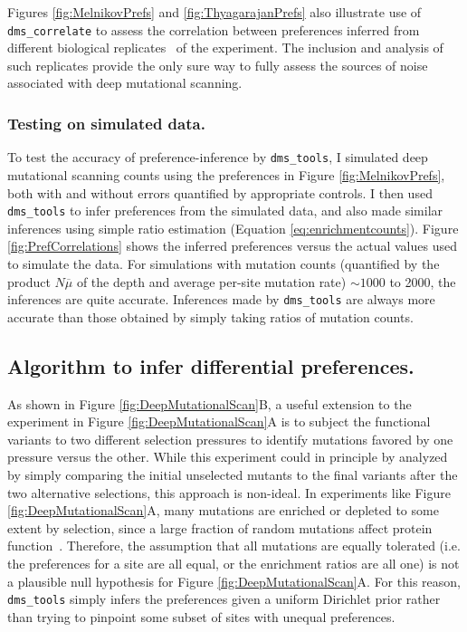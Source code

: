 \documentclass[twocolumn]{bmcart}%
\begin{document}
Figures \ref{fig:MelnikovPrefs} and \ref{fig:ThyagarajanPrefs} also illustrate use of \texttt{dms\_correlate} to assess the correlation between preferences inferred from different biological replicates~\cite{blainey2014points} of the experiment. The inclusion and analysis of such replicates provide the only sure way to fully assess the sources of noise associated with deep mutational scanning.

\subsubsection*{Testing on simulated data.}
To test the accuracy of preference-inference by \texttt{dms\_tools}, I simulated deep mutational scanning counts using the preferences in Figure \ref{fig:MelnikovPrefs}, both with and without errors quantified by appropriate controls. I then used \texttt{dms\_tools} to infer preferences from the simulated data, and also made similar inferences using simple ratio estimation (Equation \ref{eq:enrichmentcounts}). Figure \ref{fig:PrefCorrelations} shows the inferred preferences versus the actual values used to simulate the data. For simulations with mutation counts (quantified by the product $N\overline{\mu}$ of the depth and average per-site mutation rate) $\sim 1000$ to 2000, the inferences are quite accurate. Inferences made by \texttt{dms\_tools} are always more accurate than those obtained by simply taking ratios of mutation counts.

\subsection*{Algorithm to infer differential preferences.}
As shown in Figure \ref{fig:DeepMutationalScan}B, a useful extension to the experiment in Figure \ref{fig:DeepMutationalScan}A is to subject the functional variants to two different selection pressures to identify mutations favored by one pressure versus the other. While this experiment could in principle by analyzed by simply comparing the initial unselected mutants to the final variants after the two alternative selections, this approach is non-ideal. In experiments like Figure \ref{fig:DeepMutationalScan}A, many mutations are enriched or depleted to some extent by selection, since a large fraction of random mutations affect protein function~\cite{shortle1985,rennell1991,shafikhani1997,guo2004,bloom2005}. Therefore, the assumption that all mutations are equally tolerated (i.e. the preferences for a site are all equal, or the enrichment ratios are all one) is not a plausible null hypothesis for Figure \ref{fig:DeepMutationalScan}A. For this reason, \texttt{dms\_tools} simply infers the preferences given a uniform Dirichlet prior rather than trying to pinpoint some subset of sites with unequal preferences. 
\end{document}

